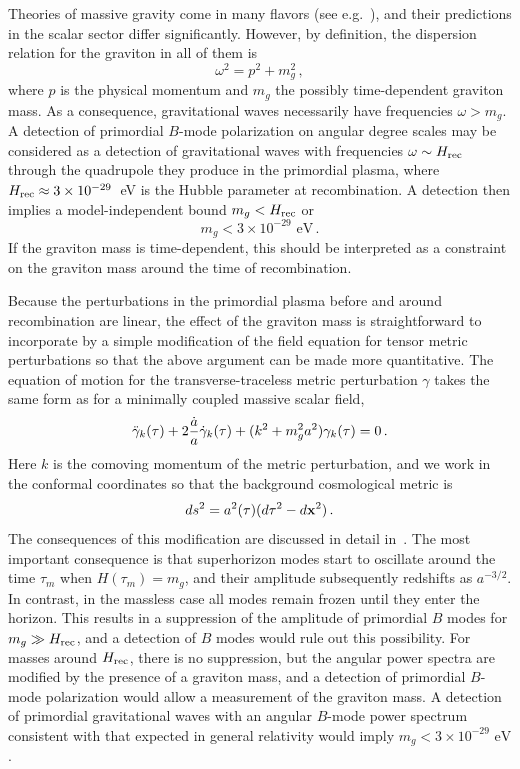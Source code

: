 Theories of massive gravity come in many flavors (see e.g.~\cite{Dubovsky:2004sg,Hinterbichler:2011tt}), and their predictions in the scalar sector differ significantly. However, by definition, the dispersion relation for the graviton in all of them is
\begin{equation}
\omega^2=p^2+m_g^2\,,
\end{equation}
where $p$ is the physical momentum and $m_g$ the possibly time-dependent graviton mass. As a consequence, gravitational waves necessarily have frequencies $\omega>m_g$. A detection of primordial $B$-mode polarization on angular degree scales may be considered as a detection of gravitational waves with frequencies $\omega\sim H_{\rm rec}$ through the quadrupole they produce in the primordial plasma, where $H_{\rm rec}\approx 3\times 10^{-29}$~eV is the Hubble parameter at recombination. A detection then implies a model-independent bound $m_g<H_{\rm rec}$ or 
\begin{equation}
m_g< 3\times 10^{-29}{\mbox{ eV}}\,.
\end{equation}
If the graviton mass is time-dependent, this should be interpreted as a constraint on the graviton mass around the time of recombination.

Because the perturbations in the primordial plasma before and around recombination are linear, the effect of the graviton mass is straightforward to incorporate by a simple modification of the field equation for tensor metric perturbations so that the above argument can be made more quantitative. The equation of motion for the transverse-traceless metric perturbation $\gamma$ takes the same form as for a minimally coupled massive scalar field,
\begin{equation}
\label{massive}
\ddot{\gamma}_k(\tau)+2{\dot a\over a} \dot{\gamma}_k(\tau)+(k^2+m_g^2 a^2) \gamma_k(\tau)=0\,.
\end{equation}
Here $k$ is the comoving momentum of the metric perturbation, and we work in the conformal coordinates so that the background cosmological metric is
\begin{equation}
ds^2= a^2(\tau)(d\tau^2-d{\bf x}^2)\,.
\end{equation}
The consequences of this modification are discussed in detail in~\cite{Dubovsky:2009xk}. The most important consequence is that superhorizon modes start to oscillate around the time $\tau_m$ when $H(\tau_m)=m_g$, and their amplitude subsequently redshifts as $a^{-3/2}$. In contrast, in the massless case all modes remain frozen until they enter the horizon. This results in a suppression of the amplitude of primordial $B$ modes for $m_g\gg H_{\rm rec}$, and a detection of $B$ modes would rule out this possibility. For masses around $H_{\rm rec}$, there is no suppression, but the angular power spectra are modified by the presence of a graviton mass, and a detection of primordial $B$-mode polarization would allow a measurement of the graviton mass. A detection of primordial gravitational waves with an angular $B$-mode power spectrum consistent with that expected in general relativity would imply $m_g< 3\times 10^{-29}{\mbox{ eV}}$.
 
